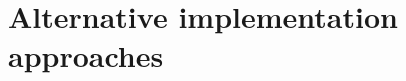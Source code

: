 %
%
%
%
%
%
%
%
%
%



\section{Alternative implementation approaches}\label{sec:implementing-the-specification-from-scratch}

